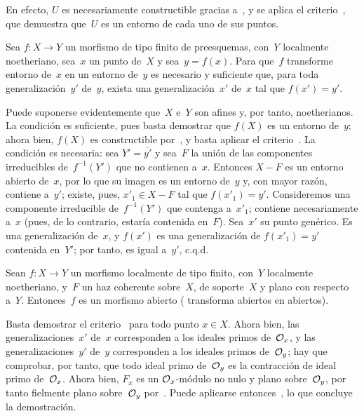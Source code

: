 En efecto, $U$ es necesariamente constructible gracias a~, y se
aplica el criterio~,
que demuestra que~$U$ es un entorno de cada uno de sus puntos.

\begin{corollaire}
\label{IV.6.5}
Sea $f\colon X\to Y$ un morfismo de tipo finito de preesquemas, con~$Y$
localmente noetheriano, sea~$x$ un punto de~$X$ y sea~$y=f(x)$. Para que~$f$
transforme  entorno de~$x$ en un
entorno de~$y$ es necesario y suficiente que, para toda generalización~$y'$
de~$y$, exista una generalización~$x'$ de~$x$ tal que $f(x')=y'$.
\end{corollaire}

Puede suponerse evidentemente que~$X$ e~$Y$ son afines y, por tanto,
noetherianos. La condición es suficiente, pues basta demostrar que $f(X)$ es
un entorno de~$y$; ahora bien, $f(X)$ es constructible
por~, y basta aplicar
el criterio~.
La condición es necesaria: sea $Y'=\overline{y'}$ y sea~$F$ la unión de las
componentes irreducibles de~$f^{-1}(Y')$ que no contienen a~$x$. Entonces
$X-F$ es un entorno abierto de~$x$, por lo que su imagen es un entorno de~$y$
y, con mayor razón, contiene a~$y'$; existe, pues, $x'_1\in X-F$ tal que
$f(x'_1)=y'$. Consideremos una componente irreducible de~$f^{-1}(Y')$ que
contenga a~$x'_1$; contiene necesariamente a~$x$ (pues, de lo contrario,
estaría contenida en~$F$). Sea~$x'$ su punto genérico. Es una generalización
de~$x$, y $f(x')$ es una generalización de $f(x'_1)=y'$ contenida en~$Y'$;
por tanto, es igual a~$y'$, c.q.d.

\begin{theoreme}
\label{IV.6.6}
Sean $f\colon X\to Y$ un morfismo localmente de tipo finito, con~$Y$
localmente noetheriano, y~$F$ un haz coherente sobre~$X$, de soporte~$X$ y
plano con respecto a~$Y$. Entonces~$f$ es un morfismo abierto (\ie
transforma abiertos en abiertos).
\end{theoreme}

Basta demostrar el criterio~ para todo punto $x\in X$. Ahora
bien, las generalizaciones~$x'$ de~$x$ corresponden a los ideales primos
de~$\cal O_x$, y las generalizaciones~$y'$ de~$y$ corresponden a los ideales
primos de~$\cal O_y$; hay que comprobar, por tanto, que todo ideal primo
de~$\cal O_y$ es la contracción de
 ideal primo de~$\cal O_x$.
Ahora bien, $F_x$ es un $\cal O_x$-módulo no nulo y plano
sobre~$\cal O_y$, por tanto fielmente plano sobre~$\cal O_y$
por~. Puede aplicarse entonces~, lo que concluye la
demostración.

